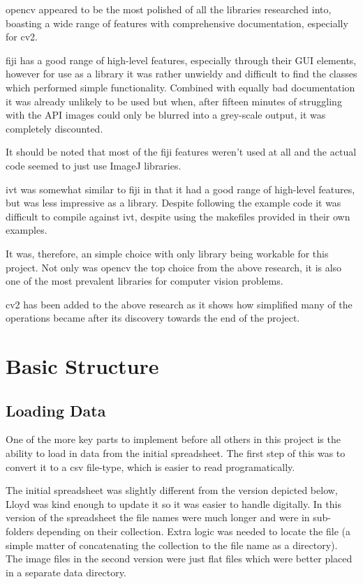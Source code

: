 \gls{opencv} appeared to be the most polished of all the libraries researched into, boasting a 
wide range of features with comprehensive documentation, especially for \gls{cv2}. 

\gls{fiji} has a good range of high-level features, especially through their GUI elements, however
for use as a library it was rather unwieldy and difficult to find the classes which performed 
simple functionality. Combined with equally bad documentation it was already unlikely to be used
but when, after fifteen minutes of struggling with the API images could only be blurred into a
grey-scale output, it was completely discounted.

It should be noted that most of the \gls{fiji} features weren't used at all and the actual code
seemed to just use ImageJ libraries.

\gls{ivt} was somewhat similar to \gls{fiji} in that it had a good range of high-level features, 
but was less impressive as a library. Despite following the example code it was difficult to 
compile against \gls{ivt}, despite using the makefiles provided in their own examples.

It was, therefore, an simple choice with only library being workable for this project. Not only
was \gls{opencv} the top choice from the above research, it is also one of the most prevalent
libraries for computer vision problems.

\gls{cv2} has been added to the above research as it shows how simplified many of the operations 
became after its discovery towards the end of the project.

\section{Basic Structure}

\subsection{Loading Data}
One of the more key parts to implement before all others in this project is the ability to load in
data from the initial spreadsheet. The first step of this was to convert it to a \gls{csv} 
file-type, which is easier to read programatically.

The initial spreadsheet was slightly different from the version depicted below, Lloyd was kind 
enough to update it so it was easier to handle digitally. In this version of the spreadsheet the
file names were much longer and were in sub-folders depending on their collection. Extra logic was
needed to locate the file (a simple matter of concatenating the collection to the file name as a
directory). The image files in the second version were just flat files which were better placed in
a separate data directory.

